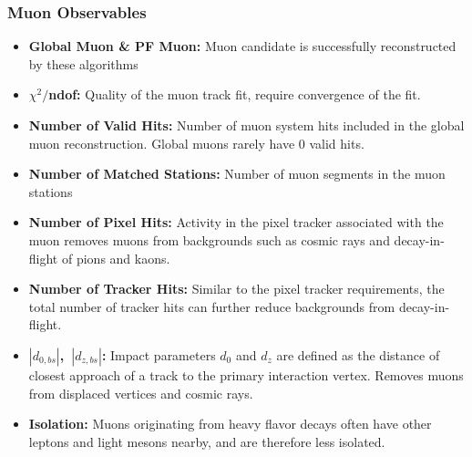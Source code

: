 \subsubsection{Muon Observables}
\begin{itemize}
    \item \textbf{Global Muon \& PF Muon:} Muon candidate is successfully reconstructed by these algorithms
    \item \textbf{$\chi^2/$ndof:} Quality of the muon track fit, require convergence of the fit.
    \item \textbf{Number of Valid Hits:} Number of muon system hits included in the global muon reconstruction. Global muons rarely have 0 valid hits.
    \item \textbf{Number of Matched Stations:} Number of muon segments in the muon stations
    \item \textbf{Number of Pixel Hits:} Activity in the pixel tracker associated with the muon removes muons from backgrounds such as cosmic rays and decay-in-flight of pions and kaons. 
    \item \textbf{Number of Tracker Hits:} Similar to the pixel tracker requirements, the total number of tracker hits can further reduce backgrounds from decay-in-flight.
    \item \textbf{$|d_{0,bs}|$,~$|d_{z,bs}|$:} Impact parameters $d_0$ and $d_z$ are defined as the distance of closest approach of a track to the primary interaction vertex. Removes muons from displaced vertices and cosmic rays. 
    \item \textbf{Isolation:} Muons originating from heavy flavor decays often have other leptons and light mesons nearby, and are therefore less isolated.
\end{itemize}




